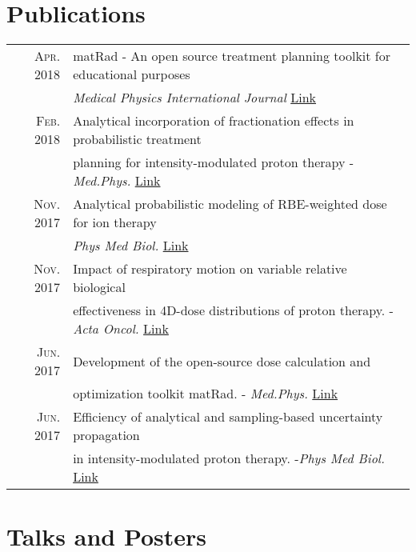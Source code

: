 \documentclass[a4paper,10pt]{article}
\begin{document}
\vspace{0.5cm}

\section{Publications}

\begin{tabular}{rl}
\textsc{Apr.} 2018 & matRad - An open source treatment planning toolkit for educational purposes\\
& \emph{Medical Physics International Journal} \href{http://www.mpijournal.org/pdf/2018-01/MPI-2018-01-p119.pdf}{Link}\\
\textsc{Feb.} 2018 & Analytical incorporation of fractionation effects in probabilistic treatment\\
& planning for intensity-modulated proton therapy  -\emph{ Med.Phys.} \href{https://www.ncbi.nlm.nih.gov/pubmed/29393506}{Link}\\
\textsc{Nov.} 2017 & Analytical probabilistic modeling of RBE-weighted dose for ion therapy \\
& \emph{Phys Med Biol.} \href{https://www.ncbi.nlm.nih.gov/pubmed/28980974}{Link}\\
\textsc{Nov.} 2017 & Impact of respiratory motion on variable relative biological \\
&effectiveness in 4D-dose distributions of proton therapy. -\emph{Acta Oncol.} \href{https://www.ncbi.nlm.nih.gov/pubmed/28828913}{Link}\\
\textsc{Jun.} 2017 & Development of the open-source dose calculation and \\
& optimization toolkit matRad. -\emph{ Med.Phys.} \href{https://www.ncbi.nlm.nih.gov/pubmed/28370020}{Link}\\
\textsc{Jun.} 2017 & Efficiency of analytical and sampling-based uncertainty propagation \\
& in intensity-modulated proton therapy. -\emph{Phys Med Biol.} \href{https://www.ncbi.nlm.nih.gov/pubmed/28370020}{Link}\\
\end{tabular}

\vspace{0.5cm}

\section{Talks and Posters}
\end{document}
